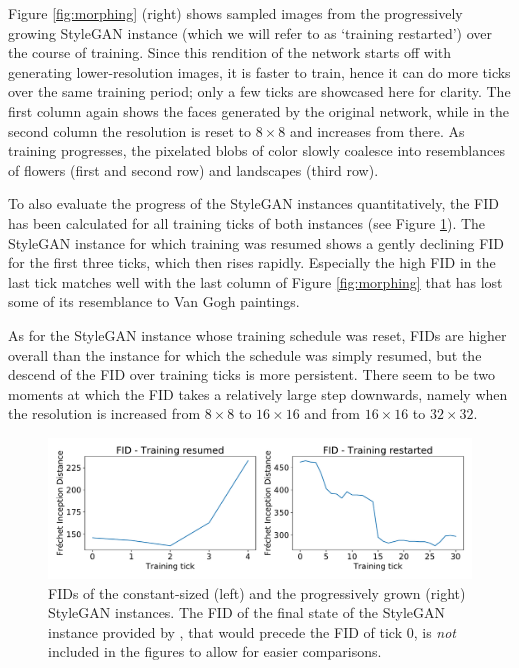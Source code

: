 \documentclass{article}
\begin{document}
Figure \ref{fig:morphing} (right) shows sampled images from the progressively growing StyleGAN instance (which we will refer to as `training restarted') over the course of training. Since this rendition of the network starts off with generating lower-resolution images, it is faster to train, hence it can do more ticks over the same training period; only a few ticks are showcased here for clarity. The first column again shows the faces generated by the original network, while in the second column the resolution is reset to $8 \times 8$ and increases from there. As training progresses, the pixelated blobs of color slowly coalesce into resemblances of flowers (first and second row) and landscapes (third row).


To also evaluate the progress of the StyleGAN instances quantitatively, the FID has been calculated for all training ticks of both instances (see Figure \ref{fig:fids}). The StyleGAN instance for which training was resumed shows a gently declining FID for the first three ticks, which then rises rapidly. Especially the high FID in the last tick matches well with the last column of Figure \ref{fig:morphing} that has lost some of its resemblance to Van Gogh paintings.

As for the StyleGAN instance whose training schedule was reset, FIDs are higher overall than the instance for which the schedule was simply resumed, but the descend of the FID over training ticks is more persistent. There seem to be two moments at which the FID takes a relatively large step downwards, namely when the resolution is increased from $8 \times 8$ to $16 \times 16$ and from $16 \times 16$ to $32 \times 32$.

\begin{figure}
    \centering
    \includegraphics[width=0.8\linewidth]{report/img/fids.pdf}
    \caption{FIDs of the constant-sized (left) and the progressively grown (right) StyleGAN instances. The FID of the final state of the StyleGAN instance provided by \cite{karras2019stylebased}, that would precede the FID of tick 0, is \textit{not} included in the figures to allow for easier comparisons.}
    \label{fig:fids}
\end{figure}
\end{document}
